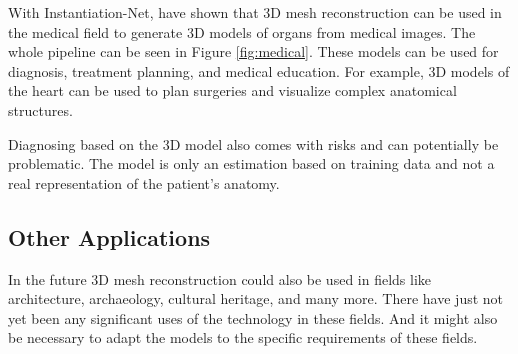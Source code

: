 With Instantiation-Net, \textcite{wang_instantiation-net_2019} have shown that 3D mesh reconstruction can be used in the medical field to generate 3D models of organs from medical images. The whole pipeline can be seen in Figure \ref{fig:medical}. These models can be used for diagnosis, treatment planning, and medical education. For example, 3D models of the heart can be used to plan surgeries and visualize complex anatomical structures.

Diagnosing based on the 3D model also comes with risks and can potentially be problematic. The model is only an estimation based on training data and not a real representation of the patient's anatomy.

\subsection{Other Applications}
In the future 3D mesh reconstruction could also be used in fields like architecture, archaeology, cultural heritage, and many more.
There have just not yet been any significant uses of the technology in these fields. And it might also be necessary to adapt the models to the specific requirements of these fields.






